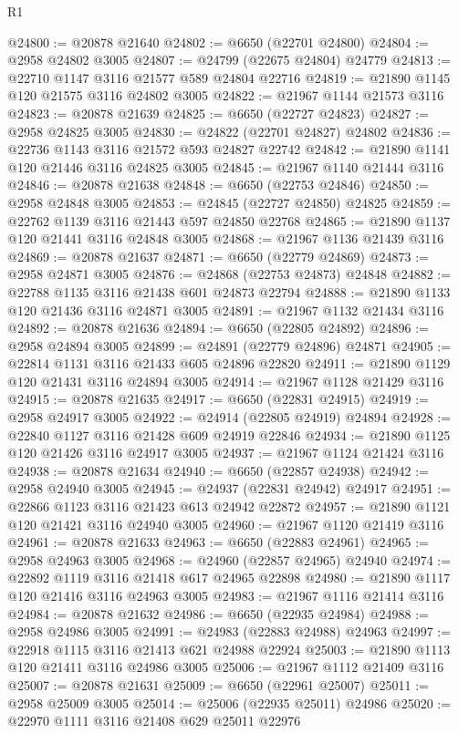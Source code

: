 \begin{lexlean}{R1}
\begin{coremodule}
@24800 := @20878 @21640
@24802 := @6650 (@22701 @24800)
@24804 := @2958 @24802 @3005
@24807 := @24799 (@22675 @24804) @24779
@24813 := @22710 @1147 @3116 @21577 @589 @24804 @22716
@24819 := @21890 @1145 @120 @21575 @3116 @24802 @3005
@24822 := @21967 @1144 @21573 @3116
@24823 := @20878 @21639
@24825 := @6650 (@22727 @24823)
@24827 := @2958 @24825 @3005
@24830 := @24822 (@22701 @24827) @24802
@24836 := @22736 @1143 @3116 @21572 @593 @24827 @22742
@24842 := @21890 @1141 @120 @21446 @3116 @24825 @3005
@24845 := @21967 @1140 @21444 @3116
@24846 := @20878 @21638
@24848 := @6650 (@22753 @24846)
@24850 := @2958 @24848 @3005
@24853 := @24845 (@22727 @24850) @24825
@24859 := @22762 @1139 @3116 @21443 @597 @24850 @22768
@24865 := @21890 @1137 @120 @21441 @3116 @24848 @3005
@24868 := @21967 @1136 @21439 @3116
@24869 := @20878 @21637
@24871 := @6650 (@22779 @24869)
@24873 := @2958 @24871 @3005
@24876 := @24868 (@22753 @24873) @24848
@24882 := @22788 @1135 @3116 @21438 @601 @24873 @22794
@24888 := @21890 @1133 @120 @21436 @3116 @24871 @3005
@24891 := @21967 @1132 @21434 @3116
@24892 := @20878 @21636
@24894 := @6650 (@22805 @24892)
@24896 := @2958 @24894 @3005
@24899 := @24891 (@22779 @24896) @24871
@24905 := @22814 @1131 @3116 @21433 @605 @24896 @22820
@24911 := @21890 @1129 @120 @21431 @3116 @24894 @3005
@24914 := @21967 @1128 @21429 @3116
@24915 := @20878 @21635
@24917 := @6650 (@22831 @24915)
@24919 := @2958 @24917 @3005
@24922 := @24914 (@22805 @24919) @24894
@24928 := @22840 @1127 @3116 @21428 @609 @24919 @22846
@24934 := @21890 @1125 @120 @21426 @3116 @24917 @3005
@24937 := @21967 @1124 @21424 @3116
@24938 := @20878 @21634
@24940 := @6650 (@22857 @24938)
@24942 := @2958 @24940 @3005
@24945 := @24937 (@22831 @24942) @24917
@24951 := @22866 @1123 @3116 @21423 @613 @24942 @22872
@24957 := @21890 @1121 @120 @21421 @3116 @24940 @3005
@24960 := @21967 @1120 @21419 @3116
@24961 := @20878 @21633
@24963 := @6650 (@22883 @24961)
@24965 := @2958 @24963 @3005
@24968 := @24960 (@22857 @24965) @24940
@24974 := @22892 @1119 @3116 @21418 @617 @24965 @22898
@24980 := @21890 @1117 @120 @21416 @3116 @24963 @3005
@24983 := @21967 @1116 @21414 @3116
@24984 := @20878 @21632
@24986 := @6650 (@22935 @24984)
@24988 := @2958 @24986 @3005
@24991 := @24983 (@22883 @24988) @24963
@24997 := @22918 @1115 @3116 @21413 @621 @24988 @22924
@25003 := @21890 @1113 @120 @21411 @3116 @24986 @3005
@25006 := @21967 @1112 @21409 @3116
@25007 := @20878 @21631
@25009 := @6650 (@22961 @25007)
@25011 := @2958 @25009 @3005
@25014 := @25006 (@22935 @25011) @24986
@25020 := @22970 @1111 @3116 @21408 @629 @25011 @22976

\end{coremodule}
\end{lexlean}
